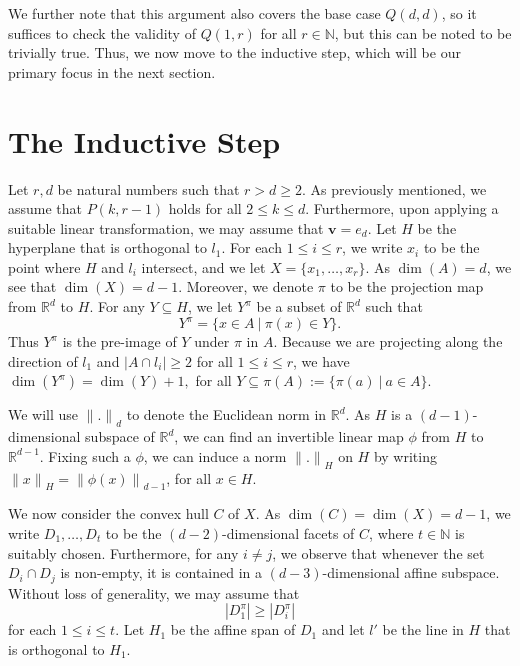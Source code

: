 \documentclass[10pt]{article}
\renewcommand\vec{\bm}
\numberwithin{equation}{section}
\begin{document}
We further note that this argument also covers the base case $Q(d,d)$, so it suffices to check the validity of $Q(1,r)$ for all $r \in \mathbb{N}$, but this can be noted to be trivially true. Thus, we now move to the inductive step, which will be our primary focus in the next section.





\section{The Inductive Step}

Let $r,d$ be natural numbers such that $r > d \geq 2$. As previously mentioned, we assume that $P(k,r-1)$ holds for all $2 \leq k \leq d$. Furthermore, upon applying a suitable linear transformation, we may assume that $\vec{v} = e_d$. Let $H$ be the hyperplane that is orthogonal to $l_1$. For each $1 \leq i \leq r$, we write $x_i$ to be the point where $H$ and $l_i$ intersect, and we let $X = \{ x_1, \dots, x_r \}$. As $\dim(A) = d$, we see that $\dim(X) = d-1.$ Moreover, we denote $\pi$ to be the projection map from $\mathbb{R}^d$ to $H$. For any $Y \subseteq H$, we let $Y^{\pi}$ be a subset of $\mathbb{R}^d$ such that
\[Y^{\pi} = \{ x \in A \ | \ \pi(x) \in Y \}. \]
Thus $Y^{\pi}$ is the pre-image of $Y$ under $\pi$ in $A$. Because we are projecting along the direction of $l_1$ and $|A \cap l_i| \geq 2$ for all $1 \leq i \leq r$, we have $\dim(Y^{\pi}) = \dim(Y) + 1,$ for all $Y \subseteq \pi(A) := \{ \pi(a) \ | \ a \in A \} $. 
\par

We will use ${\|.\|}_d$ to denote the Euclidean norm in $\mathbb{R}^d$. As $H$ is a $(d-1)$-dimensional subspace of $\mathbb{R}^d$, we can find an invertible linear map $\phi$ from $H$ to $\mathbb{R}^{d-1}$. Fixing such a $\phi$, we can induce a norm ${\|.\|}_H$ on $H$ by writing ${\|x\|}_H = {\|\phi(x) \|}_{d-1}$, for all $x \in H$. 
\par

We now consider the convex hull $C$ of $X$. As $\dim(C) = \dim(X) = d-1$, we write $D_1, \dots, D_{t}$ to be the $(d-2)$-dimensional facets of $C$, where $t \in \mathbb{N}$ is suitably chosen. Furthermore, for any $i \neq j$, we observe that whenever the set $D_i \cap D_j$ is non-empty, it is contained in a $(d-3)$-dimensional affine subspace. Without loss of generality, we may assume that
\begin{equation} \label{34los}
| D_1^{\pi} | \geq |D_i^{\pi}| 
\end{equation}
for each $1 \leq i \leq t$. Let $H_1$ be the affine span of $D_1$ and let $l'$ be the line in $H$ that is orthogonal to $H_1$. 
\par
\end{document}

